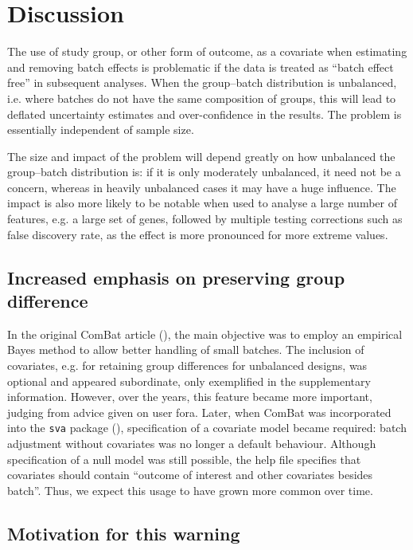 \documentclass[oupdraft]{bio}
\begin{document}
\section{Discussion}

The use of study group, or other form of outcome, as a covariate when estimating and removing batch effects is problematic if the data is treated as ``batch effect free'' in subsequent analyses. When the group--batch distribution is unbalanced, i.e. where batches do not have the same composition of groups, this will lead to deflated uncertainty estimates and over-confidence in the results. The problem is essentially independent of sample size.

The size and impact of the problem will depend greatly on how unbalanced the group--batch distribution is: if it is only moderately unbalanced, it need not be a concern, whereas in heavily unbalanced cases it may have a huge influence. The impact is also more likely to be notable when used to analyse a large number of features, e.g. a large set of genes, followed by multiple testing corrections such as false discovery rate, as the effect is more pronounced for more extreme values.

\subsection{Increased emphasis on preserving group difference}

In the original ComBat article (\citealp{Johnson2007}), the main objective was to employ an empirical Bayes method to allow better handling of small batches. The inclusion of covariates, e.g. for retaining group differences for unbalanced designs, was optional and appeared subordinate, only exemplified in the supplementary information. However, over the years, this feature became more important, judging from advice given on user fora.
Later, when ComBat was incorporated into the \texttt{sva} package (\citealp{Leek2012}), specification of a covariate model became required: batch adjustment without covariates was no longer a default behaviour. Although specification of a null model was still possible, the help file specifies that covariates should contain ``outcome of interest and other covariates besides batch''. Thus, we expect this usage to have grown more common over time.

\subsection{Motivation for this warning}
\end{document}
